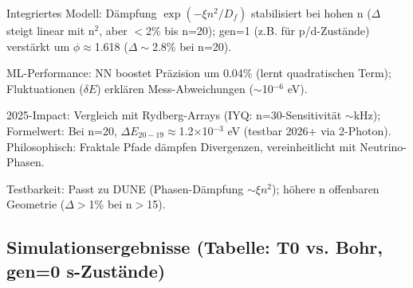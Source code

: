 	Integriertes Modell: Dämpfung $\exp(-\xi n^2 / D_f)$ stabilisiert bei hohen n ($\Delta$ steigt linear mit n$^2$, aber $<$2\% bis n=20); gen=1 (z.B. für p/d-Zustände) verstärkt um $\phi\approx$1.618 ($\Delta\sim$2.8\% bei n=20).
	
	ML-Performance: NN boostet Präzision um 0.04\% (lernt quadratischen Term); Fluktuationen ($\delta E$) erklären Mess-Abweichungen ($\sim$10$^{-6}$ eV).
	
	2025-Impact: Vergleich mit Rydberg-Arrays (IYQ: n=30-Sensitivität $\sim$kHz); Formelwert: Bei n=20, $\Delta E_{20-19} \approx$1.2$\times$10$^{-3}$ eV (testbar 2026+ via 2-Photon). Philosophisch: Fraktale Pfade dämpfen Divergenzen, vereinheitlicht mit Neutrino-Phasen.
	
	Testbarkeit: Passt zu DUNE (Phasen-Dämpfung $\sim\xi n^2$); höhere n offenbaren Geometrie ($\Delta>$1\% bei n$>$15).
	
	\subsection{Simulationsergebnisse (Tabelle: T0 vs. Bohr, gen=0 s-Zustände)}
	
	\begin{table}[ht]
		\centering
	\end{table}
	
